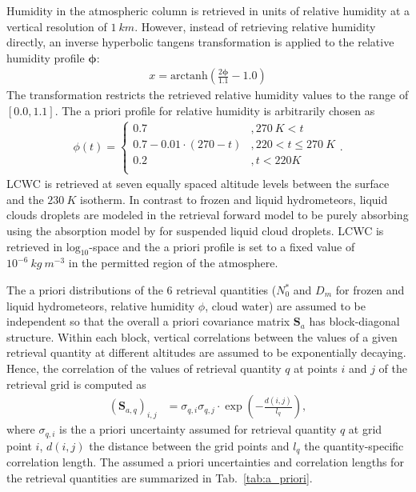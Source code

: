 \documentclass[journal abbreviation, manuscript]{copernicus}
\begin{document}
Humidity in the atmospheric column is retrieved in units of relative humidity at
a vertical resolution of $1\ \unit{km}$. However, instead of retrieving relative
humidity directly, an inverse hyperbolic tangens transformation is applied to
the relative humidity profile $\mathbf{\phi}$:
%
\begin{align}
x = \text{arctanh}(\frac{2 \mathbf{\phi}}{1.1} - 1.0)
\end{align}
%
The transformation restricts the retrieved relative humidity values to
the range of $[0.0, 1.1]$. The a priori profile for relative humidity
is arbitrarily chosen as
%
\begin{align}
\phi(t) = \begin{cases}
 0.7 &, 270\ \unit{K} < t \\
 0.7 - 0.01 \cdot (270 -t) & ,220 < t \leq  270\ \unit{K} \\
 0.2 &,t < 220 \unit{K} \\
 \end{cases}.
\end{align}
%
LCWC is retrieved at seven equally spaced altitude levels between the surface
and the $230\ \unit{K}$ isotherm. In contrast to frozen and liquid hydrometeors,
liquid clouds droplets are modeled in the retrieval forward model to be purely absorbing
using the absorption model by \cite{liebe93} for suspended liquid cloud
droplets. LCWC is retrieved in $\text{log}_{10}$-space and the a priori profile
is set to a fixed value of $10^{-6}\ \unit{kg\ m^{-3}}$ in the permitted region
of the atmosphere.

The a priori distributions of the 6 retrieval quantities ($N_0^*$ and $D_m$ for
frozen and liquid hydrometeors, relative humidity $\phi$, cloud water) are
assumed to be independent so that the overall a priori covariance matrix
$\mathbf{S}_a$ has block-diagonal structure. Within each block, vertical
correlations between the values of a given retrieval quantity at different
altitudes are assumed to be exponentially decaying. Hence, the correlation of
the values of retrieval quantity $q$ at points $i$ and $j$ of the retrieval grid
is computed as
%
\begin{align}
\left ( \mathbf{S}_{a,q} \right )_{i, j} &= \sigma_{q,i} \sigma_{q,j}
 \cdot \exp  \left ( -\frac{d(i, j)}{l_q} \right ),
\end{align}
%
where $\sigma_{q, i}$ is the a priori uncertainty assumed for retrieval
quantity $q$ at grid point $i$, $d(i, j)$ the distance between the grid
points and $l_q$ the quantity-specific correlation length. The assumed
a priori uncertainties and correlation lengths for the retrieval quantities
are summarized in Tab.~\ref{tab:a_priori}.
\end{document}
